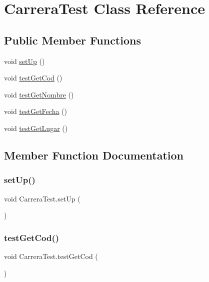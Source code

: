\hypertarget{class_carrera_test}{}\section{Carrera\+Test Class Reference}
\label{class_carrera_test}
\subsection*{Public Member Functions}
\begin{DoxyCompactItemize}
\item 
void \mbox{\hyperlink{class_carrera_test_ac6d3b15d8df501442b47edcac2cc0caf}{set\+Up}} ()
\item 
void \mbox{\hyperlink{class_carrera_test_ab42ba1aa5b6a78c2c3a970100911702d}{test\+Get\+Cod}} ()
\item 
void \mbox{\hyperlink{class_carrera_test_aa5f89ec4be4d345d7f2b7331821415cd}{test\+Get\+Nombre}} ()
\item 
void \mbox{\hyperlink{class_carrera_test_a7313b1e9c22029753dd39c7ae4fd5044}{test\+Get\+Fecha}} ()
\item 
void \mbox{\hyperlink{class_carrera_test_a34b8f775dcc547ce1c27af2b07df3b74}{test\+Get\+Lugar}} ()
\end{DoxyCompactItemize}


\subsection{Member Function Documentation}
\mbox{\label{class_carrera_test_ac6d3b15d8df501442b47edcac2cc0caf}} 
\subsubsection{\texorpdfstring{setUp()}{setUp()}}
{\footnotesize\ttfamily void Carrera\+Test.\+set\+Up (\begin{DoxyParamCaption}{ }\end{DoxyParamCaption})}

\mbox{\label{class_carrera_test_ab42ba1aa5b6a78c2c3a970100911702d}} 
\subsubsection{\texorpdfstring{testGetCod()}{testGetCod()}}
{\footnotesize\ttfamily void Carrera\+Test.\+test\+Get\+Cod (\begin{DoxyParamCaption}{ }\end{DoxyParamCaption})}

